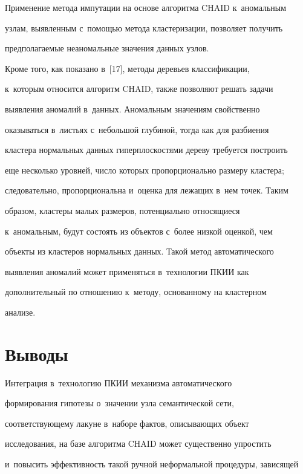 Применение метода импутации на основе алгоритма CHAID к~аномальным 


узлам, выявленным с~по\-мощью метода кластеризации, позволяет получить 


предполагаемые неаномальные значения данных узлов. 


  


  Кроме того, как показано в~[17], методы деревьев классификации, 


к~которым относится алгоритм CHAID, также позволяют решать задачи 


выявления аномалий в~данных. Аномальным значениям свойственно 


оказываться в~листь\-ях с~небольшой глубиной, тогда как для разбиения 


кластера нормальных данных гиперплоскостями дереву требуется построить 


еще несколько уровней, чис\-ло которых пропорционально размеру кластера; 


следовательно, пропорциональна и~оценка для лежащих в~нем точек. Таким 


образом, кластеры малых размеров, потенциально относящиеся 


к~аномальным, будут состоять из объектов с~более низкой оценкой, чем 


объекты из кластеров нормальных данных. Такой метод автоматического 


выявления аномалий может применяться в~технологии ПКИИ как 


дополнительный по отношению к~методу, основанному на кластерном 


анализе.





\section{Выводы}





  Интеграция в~технологию ПКИИ механизма автоматического 


формирования гипотезы о~значении узла семантической сети, 


соответствующему лакуне в~наборе фактов, описывающих объект 


исследования, на базе алгоритма CHAID может существенно упростить 


и~повысить эффективность такой ручной неформальной процедуры, зависящей 


